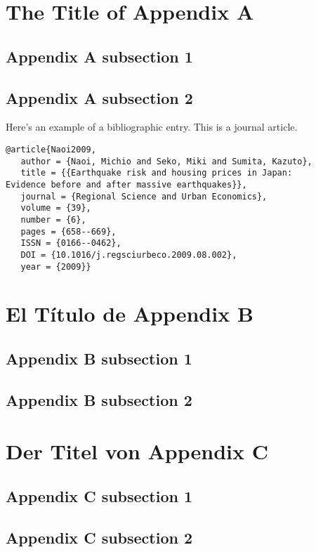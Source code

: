 \begin{appendices}
\chapter{The Title of Appendix A}
  \section{Appendix A subsection 1}
  \section{Appendix A subsection 2}
Here's an example of a bibliographic entry. This is a journal article.
\begin{verbatim}
@article{Naoi2009,
   author = {Naoi, Michio and Seko, Miki and Sumita, Kazuto},
   title = {{Earthquake risk and housing prices in Japan:
Evidence before and after massive earthquakes}},
   journal = {Regional Science and Urban Economics},
   volume = {39},
   number = {6},
   pages = {658--669},
   ISSN = {0166--0462},
   DOI = {10.1016/j.regsciurbeco.2009.08.002},
   year = {2009}}
\end{verbatim}
\chapter{El T\'itulo de Appendix B}
  \section{Appendix B subsection 1}
  \section{Appendix B subsection 2}
        
\chapter{Der Titel von Appendix C}
  \section{Appendix C subsection 1}
  \section{Appendix C subsection 2}
\end{appendices}



\newpage
\cleardoublepage{}
\begin{spacing}{1}
        
        \Minion
        \setlength\bibitemsep{\baselineskip}
        
\end{spacing}
